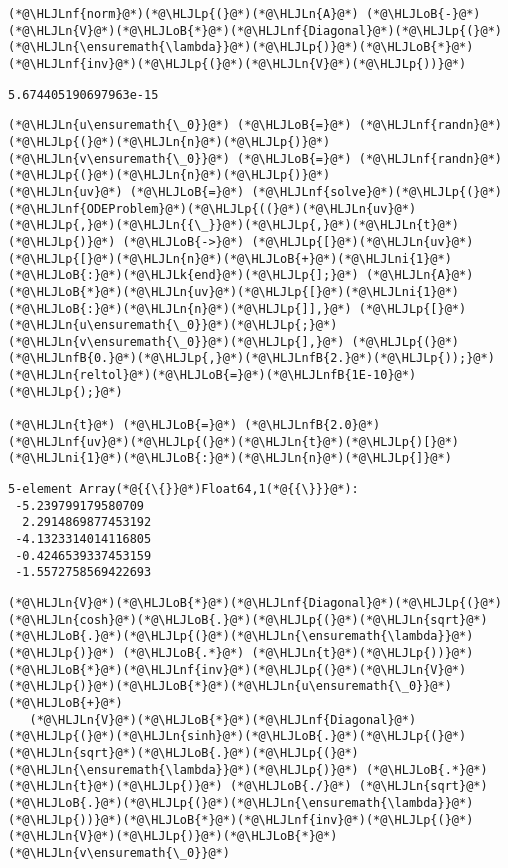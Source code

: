 \documentclass[12pt,a4paper]{article}
\newcommand{\HLJLk}[1]{\textcolor[RGB]{148,91,176}{\textbf{#1}}}
\newcommand{\HLJLn}[1]{#1}
\newcommand{\HLJLnf}[1]{\textcolor[RGB]{66,102,213}{#1}}
\newcommand{\HLJLnfB}[1]{\textcolor[RGB]{59,151,46}{#1}}
\newcommand{\HLJLni}[1]{\textcolor[RGB]{59,151,46}{#1}}
\newcommand{\HLJLoB}[1]{\textcolor[RGB]{102,102,102}{\textbf{#1}}}
\newcommand{\HLJLp}[1]{#1}
\begin{document}
\begin{lstlisting}
(*@\HLJLnf{norm}@*)(*@\HLJLp{(}@*)(*@\HLJLn{A}@*) (*@\HLJLoB{-}@*) (*@\HLJLn{V}@*)(*@\HLJLoB{*}@*)(*@\HLJLnf{Diagonal}@*)(*@\HLJLp{(}@*)(*@\HLJLn{\ensuremath{\lambda}}@*)(*@\HLJLp{)}@*)(*@\HLJLoB{*}@*)(*@\HLJLnf{inv}@*)(*@\HLJLp{(}@*)(*@\HLJLn{V}@*)(*@\HLJLp{))}@*)
\end{lstlisting}

\begin{lstlisting}
5.674405190697963e-15
\end{lstlisting}


\begin{lstlisting}
(*@\HLJLn{u\ensuremath{\_0}}@*) (*@\HLJLoB{=}@*) (*@\HLJLnf{randn}@*)(*@\HLJLp{(}@*)(*@\HLJLn{n}@*)(*@\HLJLp{)}@*)
(*@\HLJLn{v\ensuremath{\_0}}@*) (*@\HLJLoB{=}@*) (*@\HLJLnf{randn}@*)(*@\HLJLp{(}@*)(*@\HLJLn{n}@*)(*@\HLJLp{)}@*)
(*@\HLJLn{uv}@*) (*@\HLJLoB{=}@*) (*@\HLJLnf{solve}@*)(*@\HLJLp{(}@*)(*@\HLJLnf{ODEProblem}@*)(*@\HLJLp{((}@*)(*@\HLJLn{uv}@*)(*@\HLJLp{,}@*)(*@\HLJLn{{\_}}@*)(*@\HLJLp{,}@*)(*@\HLJLn{t}@*)(*@\HLJLp{)}@*) (*@\HLJLoB{->}@*) (*@\HLJLp{[}@*)(*@\HLJLn{uv}@*)(*@\HLJLp{[}@*)(*@\HLJLn{n}@*)(*@\HLJLoB{+}@*)(*@\HLJLni{1}@*)(*@\HLJLoB{:}@*)(*@\HLJLk{end}@*)(*@\HLJLp{];}@*) (*@\HLJLn{A}@*)(*@\HLJLoB{*}@*)(*@\HLJLn{uv}@*)(*@\HLJLp{[}@*)(*@\HLJLni{1}@*)(*@\HLJLoB{:}@*)(*@\HLJLn{n}@*)(*@\HLJLp{]],}@*) (*@\HLJLp{[}@*)(*@\HLJLn{u\ensuremath{\_0}}@*)(*@\HLJLp{;}@*) (*@\HLJLn{v\ensuremath{\_0}}@*)(*@\HLJLp{],}@*) (*@\HLJLp{(}@*)(*@\HLJLnfB{0.}@*)(*@\HLJLp{,}@*)(*@\HLJLnfB{2.}@*)(*@\HLJLp{));}@*) (*@\HLJLn{reltol}@*)(*@\HLJLoB{=}@*)(*@\HLJLnfB{1E-10}@*)(*@\HLJLp{);}@*)

(*@\HLJLn{t}@*) (*@\HLJLoB{=}@*) (*@\HLJLnfB{2.0}@*)
(*@\HLJLnf{uv}@*)(*@\HLJLp{(}@*)(*@\HLJLn{t}@*)(*@\HLJLp{)[}@*)(*@\HLJLni{1}@*)(*@\HLJLoB{:}@*)(*@\HLJLn{n}@*)(*@\HLJLp{]}@*)
\end{lstlisting}

\begin{lstlisting}
5-element Array(*@{{\{}}@*)Float64,1(*@{{\}}}@*):
 -5.239799179580709
  2.2914869877453192
 -4.1323314014116805
 -0.4246539337453159
 -1.5572758569422693
\end{lstlisting}


\begin{lstlisting}
(*@\HLJLn{V}@*)(*@\HLJLoB{*}@*)(*@\HLJLnf{Diagonal}@*)(*@\HLJLp{(}@*)(*@\HLJLn{cosh}@*)(*@\HLJLoB{.}@*)(*@\HLJLp{(}@*)(*@\HLJLn{sqrt}@*)(*@\HLJLoB{.}@*)(*@\HLJLp{(}@*)(*@\HLJLn{\ensuremath{\lambda}}@*)(*@\HLJLp{)}@*) (*@\HLJLoB{.*}@*) (*@\HLJLn{t}@*)(*@\HLJLp{))}@*)(*@\HLJLoB{*}@*)(*@\HLJLnf{inv}@*)(*@\HLJLp{(}@*)(*@\HLJLn{V}@*)(*@\HLJLp{)}@*)(*@\HLJLoB{*}@*)(*@\HLJLn{u\ensuremath{\_0}}@*) (*@\HLJLoB{+}@*)
   (*@\HLJLn{V}@*)(*@\HLJLoB{*}@*)(*@\HLJLnf{Diagonal}@*)(*@\HLJLp{(}@*)(*@\HLJLn{sinh}@*)(*@\HLJLoB{.}@*)(*@\HLJLp{(}@*)(*@\HLJLn{sqrt}@*)(*@\HLJLoB{.}@*)(*@\HLJLp{(}@*)(*@\HLJLn{\ensuremath{\lambda}}@*)(*@\HLJLp{)}@*) (*@\HLJLoB{.*}@*) (*@\HLJLn{t}@*)(*@\HLJLp{)}@*) (*@\HLJLoB{./}@*) (*@\HLJLn{sqrt}@*)(*@\HLJLoB{.}@*)(*@\HLJLp{(}@*)(*@\HLJLn{\ensuremath{\lambda}}@*)(*@\HLJLp{))}@*)(*@\HLJLoB{*}@*)(*@\HLJLnf{inv}@*)(*@\HLJLp{(}@*)(*@\HLJLn{V}@*)(*@\HLJLp{)}@*)(*@\HLJLoB{*}@*)(*@\HLJLn{v\ensuremath{\_0}}@*)
\end{lstlisting}
\end{document}
